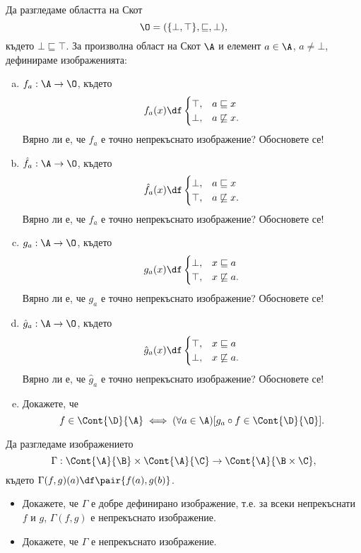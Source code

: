 \begin{problem}
  Да разгледаме областта на Скот 
  \[\O = (\{\bot,\top\},\sqsubseteq, \bot),\]
  където $\bot \sqsubseteq \top$.
  За произволна област на Скот $\A$ и елемент $a \in \A$, $a \neq \bot$, дефинираме изображенията:
  \begin{enumerate}[a)]
  \item
    $f_a:\A \to \O$, където
    \[f_a(x) \df
    \begin{cases}
      \top, & a \sqsubseteq x\\
      \bot, & a \not\sqsubseteq x.
    \end{cases}\]
    Вярно ли е, че $f_a$ е точно непрекъснато изображение? Обосновете се!
  \item
    $\hat{f}_a:\A \to \O$, където
    \[\hat{f}_a(x) \df
    \begin{cases}
      \bot, & a \sqsubseteq x\\
      \top, & a \not\sqsubseteq x.
    \end{cases}\]
    Вярно ли е, че $\hat{f}_a$ е точно непрекъснато изображение? Обосновете се!
  \item 
    $g_a:\A \to \O$, където
    \[g_a(x) \df
    \begin{cases}
      \bot, & x \sqsubseteq a\\
      \top, & x \not\sqsubseteq a.
    \end{cases}\]
    Вярно ли е, че $g_a$ е точно непрекъснато изображение? Обосновете се!
  \item 
    $\hat{g}_a:\A \to \O$, където
    \[\hat{g}_a(x) \df
    \begin{cases}
      \top, & x \sqsubseteq a\\
      \bot, & x \not\sqsubseteq a.
    \end{cases}\]
    Вярно ли е, че $\hat{g}_a$ е точно непрекъснато изображение? Обосновете се!
  \item
    Докажете, че 
    \[f \in \Cont{\D}{\A} \iff (\forall a \in \A)[g_a \circ f \in \Cont{\D}{\O}].\]
  \end{enumerate}
\end{problem}

\begin{problem}
  Да разгледаме изображението
  \[\Gamma: \Cont{\A}{\B} \times \Cont{\A}{\C} \to \Cont{\A}{\B\times\C},\]
  където $\Gamma(f,g)(a) \df \pair{f(a),g(b)}$.
  \begin{itemize}
  \item
    Докажете, че $\Gamma$ е добре дефинирано изображение, т.е. за всеки непрекъснати $f$ и $g$,
    $\Gamma(f,g)$ е непрекъснато изображение.
  \item 
    Докажете, че $\Gamma$ е непрекъснато изображение.
  \end{itemize}
\end{problem}

